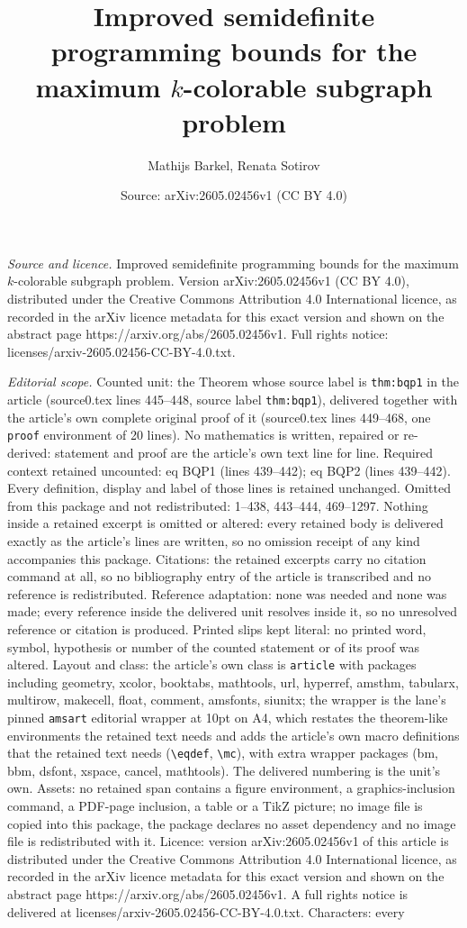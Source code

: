 \documentclass[10pt,a4paper]{amsart}
\title[Improved semidefinite programming bounds for the maximum $k$]{Improved semidefinite programming bounds for the maximum $k$-colorable subgraph problem}
\author{Mathijs Barkel, Renata Sotirov}
\date{Source: arXiv:2605.02456v1 (CC BY 4.0)}
\begin{document}
\maketitle

\noindent\emph{Source and licence.} Improved semidefinite programming bounds for the maximum $k$-colorable subgraph problem. Version arXiv:2605.02456v1 (CC BY 4.0), distributed under the Creative Commons Attribution 4.0 International licence, as recorded in the arXiv licence metadata for this exact version and shown on the abstract page https://arxiv.org/abs/2605.02456v1. Full rights notice: licenses/arxiv-2605.02456-CC-BY-4.0.txt.\par\smallskip

\noindent\textit{Editorial scope.} Counted unit: the Theorem whose source label is \texttt{thm:bqp1} in the article (source0.tex lines 445--448, source label \texttt{thm:bqp1}), delivered together with the article's own complete original proof of it (source0.tex lines 449--468, one \texttt{proof} environment of 20 lines). No mathematics is written, repaired or re-derived: statement and proof are the article's own text line for line. Required context retained uncounted: eq BQP1 (lines 439--442); eq BQP2 (lines 439--442). Every definition, display and label of those lines is retained unchanged. Omitted from this package and not redistributed: 1--438, 443--444, 469--1297. Nothing inside a retained excerpt is omitted or altered: every retained body is delivered exactly as the article's lines are written, so no omission receipt of any kind accompanies this package. Citations: the retained excerpts carry no citation command at all, so no bibliography entry of the article is transcribed and no reference is redistributed. Reference adaptation: none was needed and none was made; every reference inside the delivered unit resolves inside it, so no unresolved reference or citation is produced. Printed slips kept literal: no printed word, symbol, hypothesis or number of the counted statement or of its proof was altered. Layout and class: the article's own class is \texttt{article} with packages including geometry, xcolor, booktabs, mathtools, url, hyperref, amsthm, tabularx, multirow, makecell, float, comment, amsfonts, siunitx; the wrapper is the lane's pinned \texttt{amsart} editorial wrapper at 10pt on A4, which restates the theorem-like environments the retained text needs and adds the article's own macro definitions that the retained text needs (\texttt{\textbackslash eqdef}, \texttt{\textbackslash mc}), with extra wrapper packages (bm, bbm, dsfont, xspace, cancel, mathtools). The delivered numbering is the unit's own. Assets: no retained span contains a figure environment, a graphics-inclusion command, a PDF-page inclusion, a table or a TikZ picture; no image file is copied into this package, the package declares no asset dependency and no image file is redistributed with it. Licence: version arXiv:2605.02456v1 of this article is distributed under the Creative Commons Attribution 4.0 International licence, as recorded in the arXiv licence metadata for this exact version and shown on the abstract page https://arxiv.org/abs/2605.02456v1. A full rights notice is delivered at licenses/arxiv-2605.02456-CC-BY-4.0.txt. Characters: every 
\end{document}
